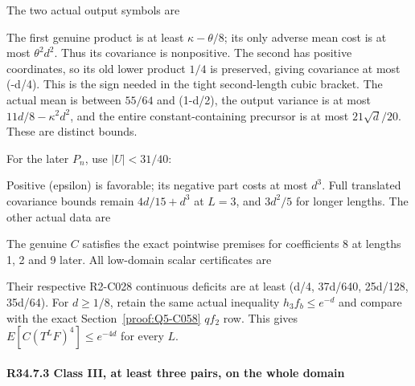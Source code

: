 The two actual output symbols are


The first genuine product is at least \(\kappa-\theta/8\); its only
adverse mean cost is at most \(\theta^2d^2\). Thus its covariance is
nonpositive. The second has positive coordinates, so its old lower
product \(1/4\) is preserved, giving covariance at most (-d/4).
This is the sign needed in the tight second-length cubic bracket.
The actual mean is between \(55/64\) and (1-d/2), the output variance
is at most \(11d/8-\kappa^2d^2\), and the entire constant-containing
precursor is at most \(21\sqrt d/20\). These are distinct bounds.

For the later \(P_n\), use \(|U|<31/40\):


Positive (epsilon) is favorable; its negative part costs at most
\(d^3\). Full translated covariance bounds remain \(4d/15+d^3\)
at \(L=3\), and \(3d^2/5\) for longer lengths. The other actual data are


The genuine \(C\) satisfies the exact pointwise premises for coefficients
8 at lengths 1, 2 and 9 later. All low-domain scalar certificates are


Their respective R2-C028 continuous deficits are at least
(d/4, 37d/640, 25d/128, 35d/64). For \(d\ge1/8\), retain the same
actual inequality \(h_3f_b\le e^{-d}\) and compare with the exact
Section~\ref{proof:Q5-C058} \(qf_2\) row. This gives \(E[C(T^LF)^4]\le e^{-4d}\) for every \(L\).

\paragraph{R34.7.3 Class III, at least three pairs, on the whole domain}

